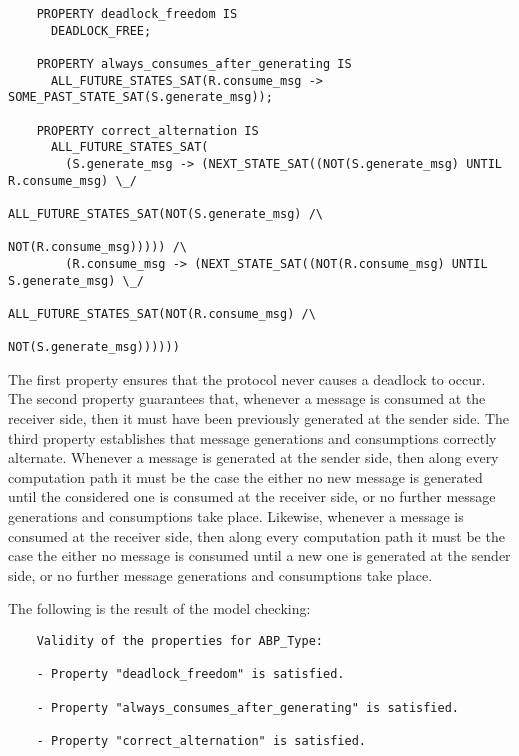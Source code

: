 	\begin{verbatim}
    PROPERTY deadlock_freedom IS
      DEADLOCK_FREE;

    PROPERTY always_consumes_after_generating IS
      ALL_FUTURE_STATES_SAT(R.consume_msg -> SOME_PAST_STATE_SAT(S.generate_msg));

    PROPERTY correct_alternation IS
      ALL_FUTURE_STATES_SAT(
        (S.generate_msg -> (NEXT_STATE_SAT((NOT(S.generate_msg) UNTIL R.consume_msg) \_/
                                           ALL_FUTURE_STATES_SAT(NOT(S.generate_msg) /\
                                                                 NOT(R.consume_msg))))) /\
        (R.consume_msg -> (NEXT_STATE_SAT((NOT(R.consume_msg) UNTIL S.generate_msg) \_/
                                          ALL_FUTURE_STATES_SAT(NOT(R.consume_msg) /\
                                                                NOT(S.generate_msg))))))
	\end{verbatim}

\noindent The first property ensures that the protocol never causes a deadlock to occur. The second property
guarantees that, whenever a message is consumed at the receiver side, then it must have been previously
generated at the sender side. The third property establishes that message generations and consumptions
correctly alternate. Whenever a message is generated at the sender side, then along every computation path
it must be the case the either no new message is generated until the considered one is consumed at the
receiver side, or no further message generations and consumptions take place. Likewise, whenever a message
is consumed at the receiver side, then along every computation path it must be the case the either no
message is consumed until a new one is generated at the sender side, or no further message generations and
consumptions take place.

The following is the result of the model checking:

	\begin{verbatim}
    Validity of the properties for ABP_Type:

    - Property "deadlock_freedom" is satisfied.

    - Property "always_consumes_after_generating" is satisfied.

    - Property "correct_alternation" is satisfied.
	\end{verbatim}



